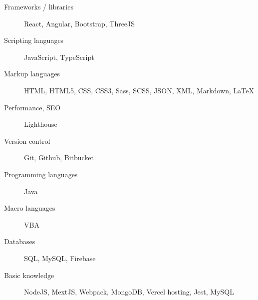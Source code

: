\documentclass{article}
\begin{document}
\begin{description}
  \item [Frameworks / libraries] React, Angular, Bootstrap, ThreeJS
  \item [Scripting languages] JavaScript, TypeScript
  \item [Markup languages] HTML, HTML5, CSS, CSS3, Sass, SCSS, JSON, XML, Markdown, LaTeX
  \item [Performance, SEO] Lighthouse
  \item [Version control] Git, Github, Bitbucket
  \item [Programming languages] Java
  \item [Macro languages] VBA
  \item [Databases] SQL, MySQL, Firebase
  \item [Basic knowledge] NodeJS, MextJS, Webpack, MongoDB, Vercel hosting, Jest, MySQL
\end{description}
\end{document}
